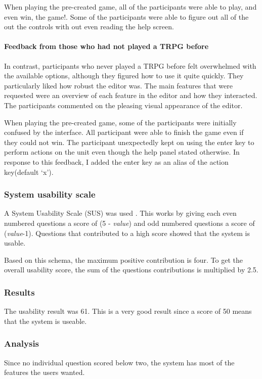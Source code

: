 When playing the pre-created game, all of the participants were able to play, and even win, the game!. Some of the participants were able to figure out all of the out the controls with out even reading the help screen. 

\paragraph{Feedback from those who had not played a TRPG  before\\} 
In contrast, participants who never played a TRPG before felt overwhelmed with the available options, although they figured how to use it quite quickly.  They particularly liked how robust the editor was. The main features that were requested were  an overview of each feature in the editor and how they interacted.  The participants commented on the pleasing visual appearance of the editor.

When playing the pre-created game, some of the participants were initially confused by the interface. All participant were able to finish the game even if they could not win.  The participant unexpectedly kept on using the enter key to perform actions on the unit even though the help panel stated otherwise. In response to this feedback, I added the enter key as an alias of the action key(default `x').

\subsubsection{System usability scale}
A System Usability Scale (SUS) was used \cite{SUS}. This works by giving each even numbered questions a score of (5 - \emph{value}) and odd numbered questions a score of (\emph{value}-1). Questions that contributed to a high score showed that the system is usable. 

Based on this schema, the maximum positive contribution is four. To get the overall usability score, the sum of the questions contributions is multiplied by 2.5. 

\subsubsection{Results}
The usability result was 61. This is a very good result since a score of 50 means that the system is useable. 

\subsubsection{Analysis}
Since no individual question scored below two, the system has most of the features the users wanted.